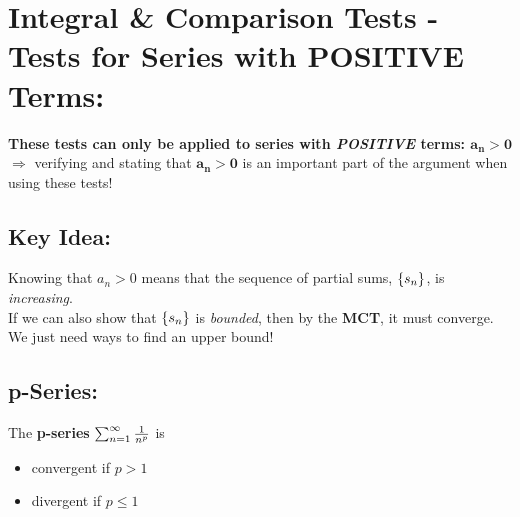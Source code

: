 
\setlength{\columnseprule}{.4pt}
\setlength{\columnsep}{3em}

\section*{Integral \& Comparison Tests - Tests for Series with POSITIVE Terms: }
\textbf{These tests can only be applied to series with \textit{POSITIVE} terms: \(\boldsymbol{a_n >0}\)}\\
\(\Rightarrow\)  verifying and stating that \(\boldsymbol{a_n >0}\) is an important part of the argument when using these tests!\\
\vspace*{.1in}
\subsection*{Key Idea:}
Knowing that \(a_n >0\) means that the sequence of partial sums, \(\lbrace s_n \rbrace\), is \textit{increasing}.\\
 If we can also show that \(\lbrace s_n \rbrace\)  is \textit{bounded}, then by the \textbf{MCT}, it must converge. \\

We just need ways to find an upper bound!\\

\vspace*{.2in}

\subsection*{p-Series:}

The \textbf{p-series} \(\sum_{n=1}^\infty \frac{1}{n^p}\) is\\
\begin{itemize}
\item convergent if \(p>1\)
\item divergent if \(p\leq 1\)
\end{itemize}






